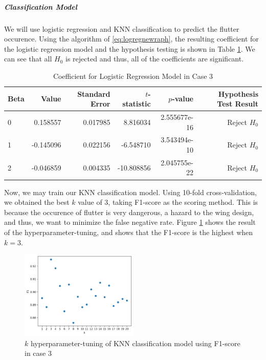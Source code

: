 \documentclass[conf]{new-aiaa}
\begin{document}
\subparagraph{Classification Model} We will use logistic regression and KNN classification to predict the flutter occurence. Using the algorithm of \eqref{eq:logregnewraph}, the resulting coefficient for the logistic regression model and the hypothesis testing is shown in Table \ref{tab:case3_logit_coef}. We can see that all $H_0$ is rejected and thus, all of the coefficients are significant. 
\begin{table}[H]
    \centering
    \caption{\label{tab:case3_logit_coef}Coefficient for Logistic Regression Model in Case 3}
    \begin{tabular}{lrrrrr}
        \toprule
        Beta &      Value &  Standard Error &  $t$-statistic &       $p$-value & Hypothesis Test Result \\
        \midrule
        0 &  0.158557 &        0.017985 &     8.816034 &  2.555677e-16 &              Reject $H_0$ \\
        1 & -0.145096 &        0.022156 &    -6.548710 &  3.543494e-10 &              Reject $H_0$ \\
        2 & -0.046859 &        0.004335 &   -10.808856 &  2.045755e-22 &              Reject $H_0$ \\
        \bottomrule
    \end{tabular}
\end{table}
Now, we may train our KNN classification model. Using 10-fold cross-validation, we obtained the best $k$ value of 3, taking F1-score as the scoring method. This is because the occurence of flutter is very dangerous, a hazard to the wing design, and thus, we want to minimize the false negative rate. Figure \ref{fig:case3_knnc_f1} shows the result of the hyperparameter-tuning, and shows that the F1-score is the highest when $k=3$. 
\begin{figure}
    \centering
    \includegraphics[width=0.5\textwidth]{graph/case3_knnc_f1.png}
    \caption{$k$ hyperparameter-tuning of KNN classification model using F1-score in case 3}
    \label{fig:case3_knnc_f1}
\end{figure}
\end{document}
